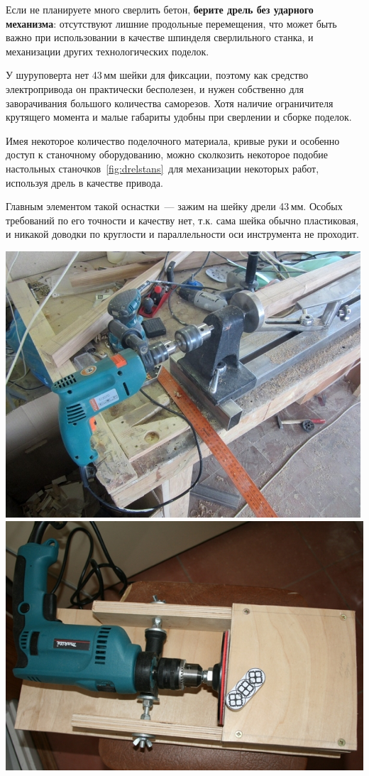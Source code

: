 Если не планируете много сверлить бетон, \textbf{берите дрель без ударного
механизма}: отсутствуют лишние продольные перемещения, что может быть важно при
использовании в качестве шпинделя сверлильного станка, и механизации других
технологических поделок.

У шуруповерта нет 43\,мм шейки для фиксации, поэтому как средство электропривода
он практически бесполезен, и нужен собственно для заворачивания большого
количества саморезов. Хотя наличие ограничителя крутящего момента и малые
габариты удобны при сверлении и сборке поделок.

\bigskip
Имея некоторое количество поделочного материала, кривые руки и особенно доступ к
станочному оборудованию, можно сколкозить некоторое подобие настольных
станочков\ \ref{fig:drelstans}\ для механизации некоторых работ,
используя дрель в качестве привода.

Главным элементом такой оснастки\ --- зажим на шейку дрели 43\,мм. Особых
требований по его точности и качеству нет, т.к. сама шейка обычно пластиковая, и
никакой доводки по круглости и параллельности оси инструмента не проходит.

\clearpage
{}\label{fig:drelstans}
\noindent\includegraphics[height=0.528\textheight]{tech/tools/DrelLathe.jpg}
\noindent\includegraphics[height=0.528\textheight]{tech/tools/DrelShliph.jpg}

